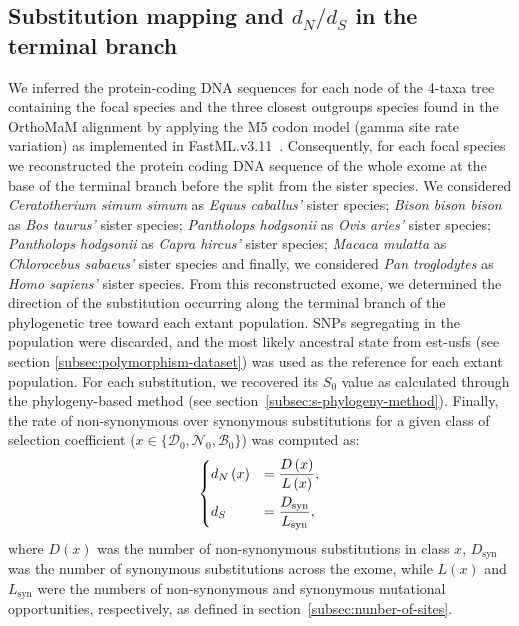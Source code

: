 \documentclass{article}
\newcommand{\dn}{d_N}
\newcommand{\ds}{d_S}
\newcommand{\dnds}{\dn / \ds}
\newcommand{\Sphy}{S_{0}}
\newcommand{\SphyDel}{\mathcal{D}_0}
\newcommand{\SphyNeu}{\mathcal{N}_0}
\newcommand{\SphyBen}{\mathcal{B}_0}
\newcommand{\Sphyclass}{x}
\begin{document}
    \subsection{Substitution mapping and $\dnds$ in the terminal branch}
    \label{subsec:substitution-mapping-in-the-terminal-branch}
    We inferred the protein-coding DNA sequences for each node of the 4-taxa tree containing the focal species and the three closest outgroups species found in the OrthoMaM alignment by applying the M5 codon model (gamma site rate variation) as implemented in FastML.v3.11~\cite{ashkenazy_fastml_2012}.
    Consequently, for each focal species we reconstructed the protein coding DNA sequence of the whole exome at the base of the terminal branch before the split from the sister species.
    We considered \textit{Ceratotherium simum simum} as \textit{Equus caballus'} sister species; \textit{Bison bison bison} as \textit{Bos taurus'} sister species; \textit{Pantholops hodgsonii} as \textit{Ovis aries'} sister species; \textit{Pantholops hodgsonii} as \textit{Capra hircus'} sister species; \textit{Macaca mulatta} as \textit{Chlorocebus sabaeus'} sister species and finally, we considered \textit{Pan troglodytes} as \textit{Homo sapiens'} sister species.
    From this reconstructed exome, we determined the direction of the substitution occurring along the terminal branch of the phylogenetic tree toward each extant population.
    SNPs segregating in the population were discarded, and the most likely ancestral state from est-usfs (see section \ref{subsec:polymorphism-dataset}) was used as the reference for each extant population.
    For each substitution, we recovered its $\Sphy$ value as calculated through the phylogeny-based method (see section~\ref{subsec:s-phylogeny-method}).
    Finally, the rate of non-synonymous over synonymous substitutions for a given class of selection coefficient ($\Sphyclass \in \{\SphyDel, \SphyNeu, \SphyBen \}$) was computed as:
    \begin{align}
        \begin{dcases}
            \dn \left( \Sphyclass \right) &= \dfrac{D\left( \Sphyclass \right)}{L \left( \Sphyclass \right)}, \\
            \ds &= \dfrac{D_{\text{syn}}}{L_{\text{syn}}},
        \end{dcases}\label{eq:dnds}
    \end{align}
    where $D \left( \Sphyclass \right) $ was the number of non-synonymous substitutions in class $\Sphyclass$, $D_{\text{syn}}$ was the number of synonymous substitutions across the exome, while $L \left( \Sphyclass \right)$ and $L_{\text{syn}}$ were the numbers of non-synonymous and synonymous mutational opportunities, respectively, as defined in section~\ref{subsec:nunber-of-sites}.
\end{document}
